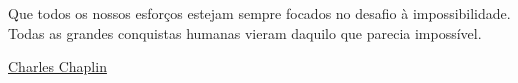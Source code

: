 \vfill
\newpage
\chapter*{}
\null\vfill
\begin{flushright}
\begin{minipage}{9.0cm}
Que todos os nossos esforços estejam sempre focados no desafio à impossibilidade. Todas as grandes conquistas humanas vieram daquilo que parecia impossível.
\end{minipage}
\end{flushright}


\begin{flushright}
 \href{https://viacarreira.com/epigrafe-para-tcc/}{Charles Chaplin}
\end{flushright}


